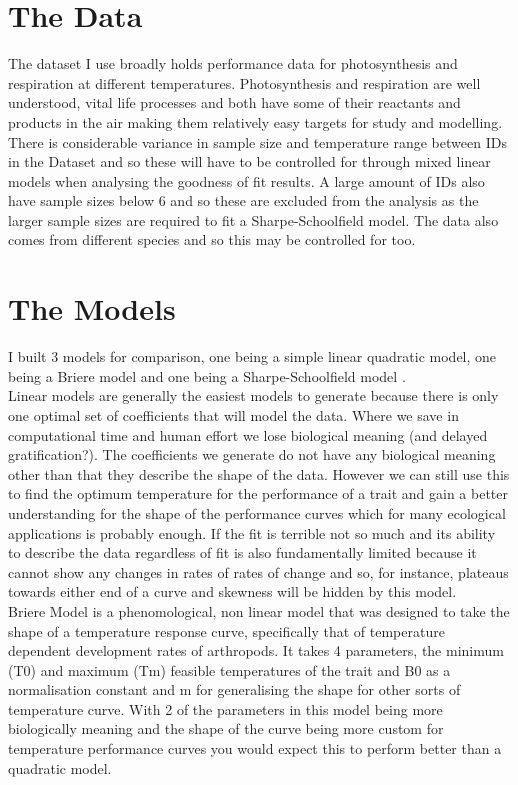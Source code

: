 \documentclass[12pt]{article}
\begin{document}
  \section{The Data}
  The dataset I use broadly holds performance data for photosynthesis and respiration at different temperatures. Photosynthesis and respiration are well understood, vital life processes and both have some of their reactants and products in the air making them relatively easy targets for study and modelling. There is considerable variance in sample size and temperature range between IDs in the Dataset and so these will have to be controlled for through mixed linear models when analysing the goodness of fit results. A large amount of IDs also have sample sizes below 6 and so these are excluded from the analysis as the larger sample sizes are required to fit a Sharpe-Schoolfield model. The data also comes from different species and so this may be controlled for too.
 
  \section{The Models}
  I built 3 models for comparison, one being a simple linear quadratic model, one being a Briere model and one being a Sharpe-Schoolfield model . 
  \\Linear models are generally the easiest models to generate because there is only one optimal set of coefficients that will model the data. Where we save in computational time and human effort we lose biological meaning (and delayed gratification?). The coefficients we generate do not have any biological meaning other than that they describe the shape of the data. However we can still use this to find the optimum temperature for the performance of a trait and gain a better understanding for the shape of the performance curves which for many ecological applications is probably enough. If the fit is terrible not so much and its ability to describe the data regardless of fit is also fundamentally limited because it cannot show any changes in rates of rates of change and so, for instance, plateaus towards either end of a curve and skewness will be hidden by this model.
  \\Briere Model \cite{Brierea} is a phenomological, non linear model that was designed to take the shape of a temperature response curve, specifically that of temperature dependent development rates of arthropods. It takes 4 parameters, the minimum (T0) and maximum (Tm) feasible temperatures of the trait and B0 as a normalisation constant and m for generalising the shape for other sorts of temperature curve. With 2 of the parameters in this model being more biologically meaning and the shape of the curve being more custom for temperature performance curves you would expect this to perform better than a quadratic model.
\end{document}
